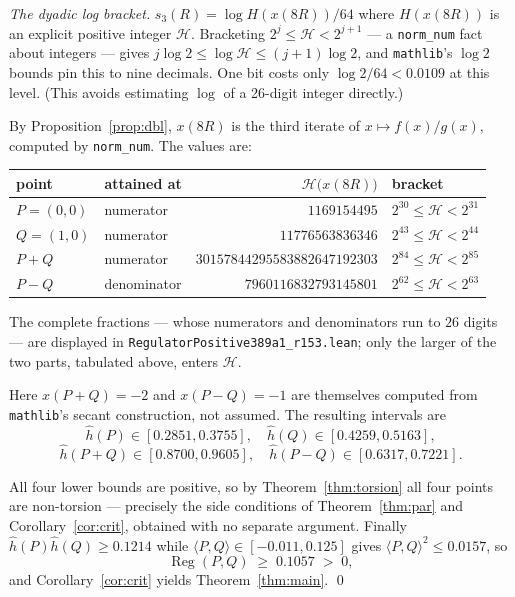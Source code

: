 \documentclass[11pt,reqno]{amsart}
\theoremstyle{plain}
\theoremstyle{definition}
\theoremstyle{remark}
\DeclareRobustCommand{\lt}[1]{\texttt{#1}}
\newcommand{\hh}{\widehat{h}}
\newcommand{\nh}{H}
\DeclareMathOperator{\reg}{Reg}
\begin{document}
\emph{The dyadic log bracket.} $s_3(R) = \log \nh(x(8R))/64$ where
$\nh(x(8R))$ is an explicit positive integer $\mathcal{H}$. Bracketing
$2^j \le \mathcal{H} < 2^{j+1}$ --- a \lt{norm\_num} fact about integers ---
gives $j\log 2 \le \log \mathcal{H} \le (j+1)\log 2$, and
\texttt{mathlib}'s $\log 2$ bounds \cite{mathlib} pin this to nine decimals.
One bit costs only $\log 2/64 < 0.0109$ at this level. (This avoids
estimating $\log$ of a 26-digit integer directly.)

By Proposition~\ref{prop:dbl}, $x(8R)$ is the third iterate of
$x \mapsto f(x)/g(x)$, computed by \lt{norm\_num}. The values are:

\begin{center}
\begin{tabular}{llrl}
\toprule
point & attained at & $\mathcal{H}\bigl(x(8R)\bigr)$ & bracket \\
\midrule
$P=(0,0)$ & numerator   & $1169154495$                 & $2^{30} \le \mathcal{H} < 2^{31}$\\
$Q=(1,0)$ & numerator   & $11776563836346$             & $2^{43} \le \mathcal{H} < 2^{44}$\\
$P{+}Q$   & numerator   & $30157844295583882647192303$ & $2^{84} \le \mathcal{H} < 2^{85}$\\
$P{-}Q$   & denominator & $7960116832793145801$        & $2^{62} \le \mathcal{H} < 2^{63}$\\
\bottomrule
\end{tabular}
\end{center}

\noindent
The complete fractions --- whose numerators and denominators run to $26$
digits --- are displayed in \lt{RegulatorPositive389a1\_r153.lean}; only the
larger of the two parts, tabulated above, enters $\mathcal{H}$.

Here $x(P{+}Q) = -2$ and $x(P{-}Q) = -1$ are themselves computed from
\texttt{mathlib}'s secant construction, not assumed. The resulting intervals
are
\[
  \hh(P) \in [0.2851, 0.3755], \quad \hh(Q) \in [0.4259, 0.5163],
\]
\[
  \hh(P{+}Q) \in [0.8700, 0.9605], \quad \hh(P{-}Q) \in [0.6317, 0.7221].
\]

All four lower bounds are positive, so by Theorem~\ref{thm:torsion} all four
points are non-torsion --- precisely the side conditions of
Theorem~\ref{thm:par} and Corollary~\ref{cor:crit}, obtained with no separate
argument. Finally $\hh(P)\hh(Q) \ge 0.1214$ while
$\langle P,Q\rangle \in [-0.011, 0.125]$ gives
$\langle P,Q\rangle^2 \le 0.0157$, so
\[
  \reg(P,Q) \;\ge\; 0.1057 \;>\; 0,
\]
and Corollary~\ref{cor:crit} yields Theorem~\ref{thm:main}. \qed
\end{document}
